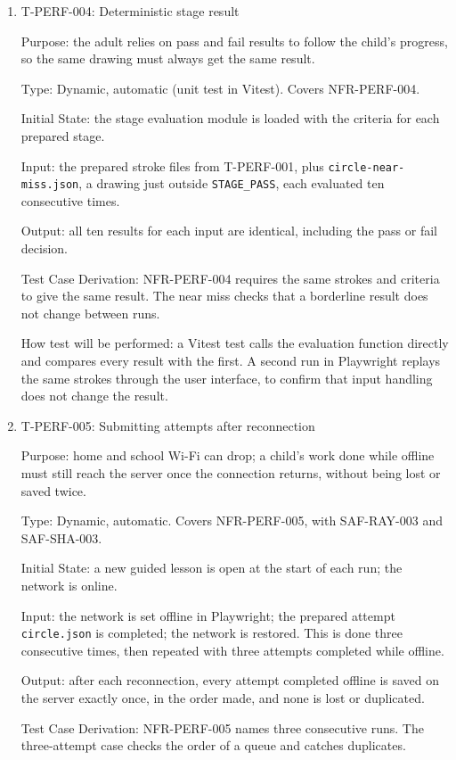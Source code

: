 \documentclass[12pt, titlepage]{article}
\newcommand{\testitem}[1]{\item #1\par\nopagebreak}
\begin{document}
\begin{enumerate}
\testitem{T-PERF-004: Deterministic stage result}

Purpose: the adult relies on pass and fail results to follow the child's progress, so the same drawing must always get the same result.

Type: Dynamic, automatic (unit test in Vitest). Covers NFR-PERF-004.

Initial State: the stage evaluation module is loaded with the criteria
for each prepared stage.

Input: the prepared stroke files from T-PERF-001, plus
\texttt{circle-\allowbreak{}near-\allowbreak{}miss.json}, a drawing just outside
\texttt{STAGE\_PASS}, each evaluated ten consecutive times.

Output: all ten results for each input are identical, including the
pass or fail decision.

Test Case Derivation: NFR-PERF-004 requires the same strokes and criteria to
give the same result. The near miss checks that a borderline result does not
change between runs.

How test will be performed: a Vitest test calls the evaluation function
directly and compares every result with the first. A second run in
Playwright replays the same strokes through the user interface, to confirm
that input handling does not change the result.

\testitem{T-PERF-005: Submitting attempts after reconnection}

Purpose: home and school Wi-Fi can drop; a child's work done while offline must still reach the server once the connection returns, without being lost or saved twice.

Type: Dynamic, automatic. Covers NFR-PERF-005, with SAF-RAY-003 and SAF-SHA-003.

Initial State: a new guided lesson is open at the start of each run; the network
is online.

Input: the network is set offline in Playwright; the prepared attempt
\texttt{circle.json} is completed; the network is restored. This is done
three consecutive times, then repeated with three attempts completed
while offline.

Output: after each reconnection, every attempt completed offline is saved
on the server exactly once, in the order made, and none is lost or
duplicated.

Test Case Derivation: NFR-PERF-005 names three consecutive runs. The
three-attempt case checks the order of a queue and catches duplicates.


\end{enumerate}
\end{document}
